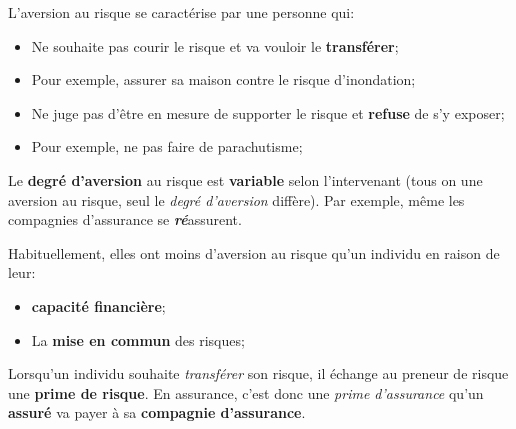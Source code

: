 \documentclass[10pt, french]{article}
\begin{document}
\begin{multicols*}{3}
\begin{definitionNOHFILL}[Aversion]
L'aversion au risque se caractérise par une personne qui:
\begin{itemize}
	\item	Ne souhaite pas courir le risque et va vouloir le \textbf{transférer};
	\item[]	Pour exemple, assurer sa maison contre le risque d'inondation;
	\item	Ne juge pas d'être en mesure de supporter le risque et \textbf{refuse} de s'y exposer;
	\item[]	Pour exemple, ne pas faire de parachutisme;
\end{itemize}
	
Le \textbf{degré d'aversion} au risque est \textbf{variable} selon l'intervenant (tous on une aversion au risque, seul le \textit{degré d'aversion} diffère). Par exemple, même les compagnies d'assurance se \textit{\textbf{ré}}assurent. 

Habituellement, elles ont moins d'aversion au risque qu'un individu en raison de leur:
\begin{itemize}
	\item	\textbf{capacité financière};
	\item	La \textbf{mise en commun} des risques;
\end{itemize} 

Lorsqu'un individu souhaite \textit{transférer} son risque, il échange au preneur de risque une \textbf{prime de risque}. En assurance, c'est donc une \textit{prime d'assurance} qu'un \textbf{assuré} va payer à sa \textbf{compagnie d'assurance}.
\end{definitionNOHFILL}


\end{multicols*}
\end{document}
